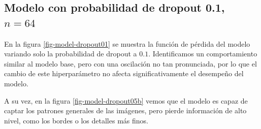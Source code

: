 \documentclass[aps,prl,reprint,groupedaddress]{revtex4-2}
\begin{document}
\subsection{Modelo con probabilidad de dropout 0.1, $n=64$}

En la figura \ref{fig-model-dropout01} se muestra la función de pérdida del
modelo variando solo la probabilidad de dropout a $0.1$. Identificamos un 
comportamiento similar al modelo base, pero con una oscilación no tan 
pronunciada, por lo que el cambio de este hiperparámetro no afecta 
significativamente el desempeño del modelo.

A su vez, en la figura \ref{fig-model-dropout05b} vemos que el modelo es capaz de 
captar los patrones generales de las imágenes, pero pierde información de alto 
nivel, como los bordes o los detalles más finos.
\end{document}
